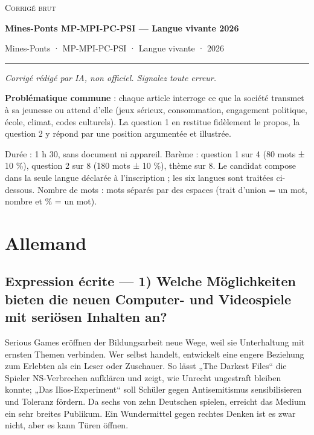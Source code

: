 \documentclass[11pt,a4paper]{article}
\begin{document}
\thispagestyle{plain}
\begin{center}
  {\small\scshape Corrigé brut}\par\smallskip
  {\LARGE\bfseries Mines-Ponts MP-MPI-PC-PSI — Langue vivante 2026\par}\medskip
  {\large Mines-Ponts · MP-MPI-PC-PSI · Langue vivante · 2026\par}
\end{center}
\vspace{2pt}\hrule\vspace{8pt}

\emph{Corrigé rédigé par IA, non officiel. Signalez toute erreur.}

\textbf{Problématique commune} : chaque article interroge ce que la société transmet à sa jeunesse ou attend d'elle (jeux sérieux, consommation, engagement politique, école, climat, codes culturels). La question 1 en restitue fidèlement le propos, la question 2 y répond par une position argumentée et illustrée.

Durée : 1 h 30, sans document ni appareil. Barème : question 1 sur 4 (80 mots ± 10 \%), question 2 sur 8 (180 mots ± 10 \%), thème sur 8. Le candidat compose dans la seule langue déclarée à l'inscription ; les six langues sont traitées ci-dessous. Nombre de mots : mots séparés par des espaces (trait d'union = un mot, nombre et \% = un mot).

\hypertarget{allemand}{%
\section{Allemand}\label{allemand}}

\hypertarget{expression-uxe9crite-1-welche-muxf6glichkeiten-bieten-die-neuen-computer--und-videospiele-mit-seriuxf6sen-inhalten-an}{%
\subsection{Expression écrite --- 1) Welche Möglichkeiten bieten die neuen Computer- und Videospiele mit seriösen Inhalten an?}\label{expression-uxe9crite-1-welche-muxf6glichkeiten-bieten-die-neuen-computer--und-videospiele-mit-seriuxf6sen-inhalten-an}}

Serious Games eröffnen der Bildungsarbeit neue Wege, weil sie Unterhaltung mit ernsten Themen verbinden. Wer selbst handelt, entwickelt eine engere Beziehung zum Erlebten als ein Leser oder Zuschauer. So lässt „The Darkest Files`` die Spieler NS-Verbrechen aufklären und zeigt, wie Unrecht ungestraft bleiben konnte; „Das Ilios-Experiment`` soll Schüler gegen Antisemitismus sensibilisieren und Toleranz fördern. Da sechs von zehn Deutschen spielen, erreicht das Medium ein sehr breites Publikum. Ein Wundermittel gegen rechtes Denken ist es zwar nicht, aber es kann Türen öffnen.
\end{document}
